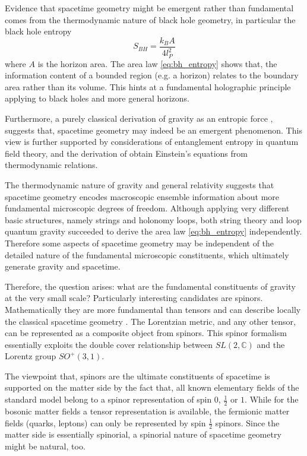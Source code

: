 \documentclass[11pt,a4paper]{article}
\theoremstyle{definition}
\begin{document}
	Evidence that spacetime geometry might be emergent rather than fundamental comes from the thermodynamic nature of black hole geometry,
	in particular the black hole entropy \cite{bekenstein1973,hawking1975}
	\begin{equation}
		S_{BH} = \frac{k_B A}{4 l_P^2}
		\label{eq:bh_entropy}
	\end{equation}
	where $A$ is the horizon area.  The area law \eqref{eq:bh_entropy} shows that, the information content of a bounded region (e.g. a horizon) relates to the boundary area rather than its volume. This hints at a fundamental holographic principle \cite{thooft1993,susskind1995} applying to black holes and more general horizons.  
	
	Furthermore, a purely classical derivation of gravity as an entropic force \cite{verlinde2011}, suggests that, spacetime geometry may indeed be an emergent phenomenon. This view is further supported by considerations of entanglement entropy in quantum field theory, and the derivation of obtain Einstein's equations from thermodynamic relations.
	
	The thermodynamic nature of gravity and general relativity suggests that spacetime geometry encodes macroscopic ensemble information about more fundamental microscopic degrees of freedom. Although applying very different basic structures, namely strings and holonomy loops,
	both string theory \cite{strominger1996} and loop quantum gravity \cite{rovelli1996} succeeded to derive the area law \eqref{eq:bh_entropy} independently. Therefore some aspects of spacetime geometry may be independent of the detailed nature of the fundamental microscopic constituents, which ultimately generate gravity and spacetime. 
	
	Therefore, the question arises: what are the fundamental constituents of gravity at the very small scale? Particularly interesting candidates are spinors. Mathematically they are more fundamental than tensors and can describe locally the classical spacetime geometry \cite{penrose1984}. The Lorentzian metric, and any other tensor, can be represented as a composite object from spinors. 
	This spinor formalism essentially exploits the double cover relationship between $SL(2,\mathbb{C})$ and the Lorentz group $SO^+(3,1)$.
	
	The viewpoint that, spinors are the ultimate constituents of spacetime is supported on the matter side by the fact that, all known elementary fields of the standard model belong to a spinor representation of spin $0$, $\frac{1}{2}$ or $1$. While for the bosonic matter fields a tensor representation is available, the  fermionic matter fields (quarks, leptons) can only be represented 
	by spin $\frac{1}{2}$ spinors. Since the matter side is essentially spinorial, a spinorial nature of spacetime geometry might be natural, too.    
	
\end{document}
